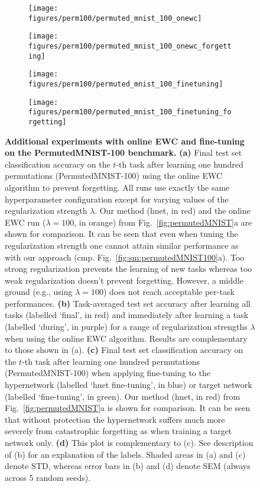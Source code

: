\documentclass{article}
\begin{document}
\begin{figure}
    \centering
    \begin{subfigure}{0.49\linewidth}
    \caption{}
    \texttt{[image: figures/perm100/permuted\_mnist\_100\_onewc]}
    \end{subfigure}
    \begin{subfigure}{0.49\linewidth}
    \caption{}
    \texttt{[image: figures/perm100/permuted\_mnist\_100\_onewc\_forgetting]}
    \end{subfigure}
    
    \begin{subfigure}{0.49\linewidth}
    \caption{}
    \texttt{[image: figures/perm100/permuted\_mnist\_100\_finetuning]}
    \end{subfigure}
    \begin{subfigure}{0.49\linewidth}
    \caption{}
    \texttt{[image: figures/perm100/permuted\_mnist\_100\_finetuning\_forgetting]}
    \end{subfigure}
    \caption{\textbf{Additional experiments with online EWC and fine-tuning on the PermutedMNIST-100 benchmark.} \textbf{(a)} Final test set classification accuracy on the $t$-th task after learning one hundred permutations (PermutedMNIST-100) using the online EWC algorithm \citep{schwarz_progress_2018} to prevent forgetting. All runs use exactly the same hyperparameter configuration except for varying values of the regularization strength $\lambda$. Our method (hnet, in red) and the online EWC run ($\lambda = 100$, in orange) from Fig.~\ref{fig:permutedMNIST}a are shown for comparison. It can be seen that even when tuning the regularization strength one cannot attain similar performance as with our approach (cmp. Fig.~\ref{fig:sm:permutedMNIST100}a). Too strong regularization prevents the learning of new tasks whereas too weak regularization doesn't prevent forgetting. However, a middle ground (e.g., using $\lambda=100$) does not reach acceptable per-task performances. \textbf{(b)} Task-averaged test set accuracy after learning all tasks (labelled `final', in red) and immediately after learning a task (labelled `during', in purple) for a range of regularization strengths $\lambda$ when using the online EWC algorithm. Results are complementary to those shown in (a). \textbf{(c)} Final test set classification accuracy on the $t$-th task after learning one hundred permutations (PermutedMNIST-100) when applying fine-tuning to the hypernetwork (labelled `hnet fine-tuning', in blue) or target network (labelled `fine-tuning', in green). Our method (hnet, in red) from Fig.~\ref{fig:permutedMNIST}a is shown for comparison. It can be seen that without protection the hypernetwork suffers much more severely from catastrophic forgetting as when training a target network only.
    \textbf{(d)} This plot is complementary to (c). See description of (b) for an explanation of the labels.
    Shaded areas in (a) and (c) denote STD, whereas error bars in (b) and (d) denote SEM (always across 5 random seeds).\label{fig:sm:permutedMNIST100:onewc:ft}}
\end{figure}
\end{document}
